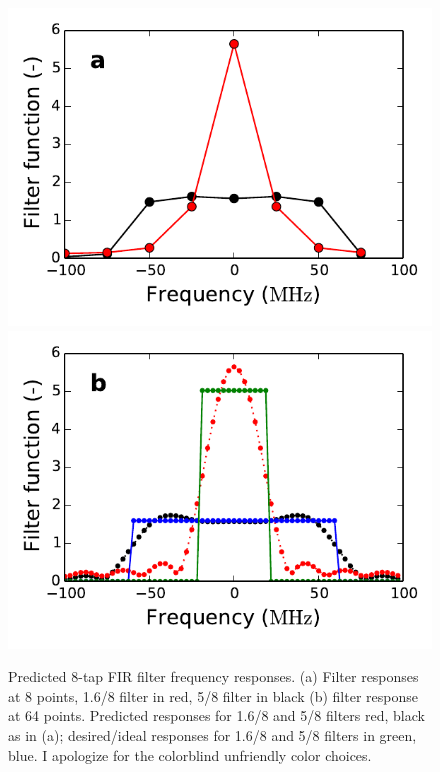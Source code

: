\documentclass[11pt]{article}
\begin{document}
\begin{figure}[!htb]
    \centering
    \includegraphics[scale=0.8]{scripts/FIR_filter_responses.pdf}
    \includegraphics[scale=0.8]{scripts/FIR_filter_responses_fine.pdf}
    \caption{Predicted 8-tap FIR filter frequency responses.
    (a) Filter responses at 8 points, 1.6/8 filter in red, 5/8 filter in black
    (b) filter response at 64 points. Predicted responses for 1.6/8 and 5/8
    filters red, black as in (a); desired/ideal responses for 1.6/8 and 5/8
    filters in green, blue.  I apologize for the colorblind unfriendly color
    choices.}
\end{figure}
\end{document}
